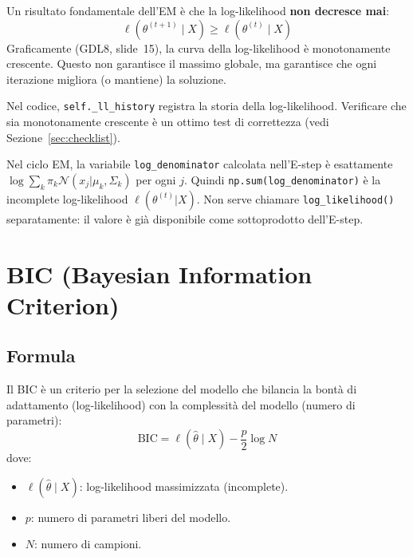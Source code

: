 \documentclass[11pt,a4paper]{article}
\newcommand{\refslide}[2]{\textsc{#1}, slide~#2}
\begin{document}
\begin{infobox}
Un risultato fondamentale dell'EM è che la log-likelihood
\textbf{non decresce mai}:
\[
  \ell(\theta^{(t+1)} \mid X) \ge \ell(\theta^{(t)} \mid X)
\]
Graficamente (\refslide{GDL8}{15}), la curva della log-likelihood
è monotonamente crescente. Questo non garantisce il massimo globale,
ma garantisce che ogni iterazione migliora (o mantiene) la soluzione.

Nel codice, \texttt{self.\_ll\_history} registra la storia della
log-likelihood. Verificare che sia monotonamente crescente è un
ottimo test di correttezza (vedi Sezione~\ref{sec:checklist}).
\end{infobox}

\begin{exbox}
Nel ciclo EM, la variabile \texttt{log\_denominator} calcolata
nell'E-step è esattamente
$\log\sum_k \pi_k\mathcal{N}(x_j|\mu_k,\Sigma_k)$ per ogni $j$.
Quindi \texttt{np.sum(log\_denominator)} è la incomplete
log-likelihood $\ell(\theta^{(t)}|X)$. Non serve chiamare
\texttt{log\_likelihood()} separatamente: il valore è già
disponibile come sottoprodotto dell'E-step.
\end{exbox}

\section{BIC (Bayesian Information Criterion)}\label{sec:bic}

\subsection{Formula}

Il BIC è un criterio per la selezione del modello che bilancia la
bontà di adattamento (log-likelihood) con la complessità del modello
(numero di parametri):
\begin{equation}\label{eq:bic}
  \mathrm{BIC} = \ell(\hat\theta \mid X) -
  \frac{p}{2}\log N
\end{equation}
dove:
\begin{itemize}[nosep]
  \item $\ell(\hat\theta \mid X)$: log-likelihood massimizzata
        (incomplete).
  \item $p$: numero di parametri liberi del modello.
  \item $N$: numero di campioni.
\end{itemize}
\end{document}
